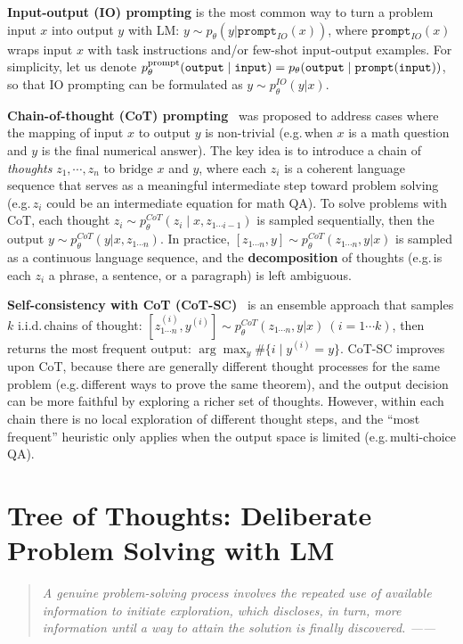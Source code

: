 \documentclass{article}
\begin{document}
\textbf{Input-output (IO) prompting} is the most common way to turn a problem input $x$ into output $y$ with LM: $y \sim p_\theta(y | \texttt{prompt}_{{IO}}(x))$, where $\texttt{prompt}_{IO}(x)$ wraps input $x$ with task instructions and/or few-shot input-output examples. For simplicity, let us denote $p_\theta^{{\rm prompt}}(\texttt{output} \mid \texttt{input}) = p_\theta(\texttt{output} \mid \texttt{prompt}(\texttt{input}))$, so that IO prompting can be formulated as $y \sim p_\theta^{IO}(y|x)$. 







\textbf{Chain-of-thought (CoT) prompting}~\citep{wei2022chain} was proposed to address cases where the mapping of input $x$ to output $y$ is  non-trivial (e.g.\,when $x$ is a math question and $y$ is the final numerical answer). The key idea is to introduce a chain of {\em thoughts} $z_1, \cdots, z_n$ to bridge $x$ and $y$, where each $z_i$ is a coherent language sequence that serves as a meaningful intermediate step toward problem solving (e.g.\,$z_i$ could be an intermediate equation for math QA). To solve problems with CoT, each thought $z_i \sim p_\theta^{CoT}(z_i \mid x, z_{1\cdots i-1})$ is sampled sequentially, then the output $y \sim p_\theta^{CoT}(y | x, z_{1 \cdots n})$. In practice, $[z_{1\cdots n}, y] \sim p_\theta^{CoT}(z_{1\cdots n}, y | x)$ is sampled as a continuous language sequence, and the \textbf{decomposition} of thoughts (e.g.\,is each $z_i$ a phrase, a sentence, or a paragraph) is left ambiguous.


\textbf{Self-consistency with CoT (CoT-SC)}~\citep{wang2022self} is an ensemble approach that samples $k$ i.i.d.\,chains of thought: $[z^{(i)}_{1\cdots n}, y^{(i)}] \sim p_\theta^{CoT}(z_{1\cdots n}, y | x) \ (i=1 \cdots k)$, then returns the most frequent output: $\arg \max_{y} \#\{i \mid y^{(i)}=y\}$. CoT-SC improves upon CoT, because there are generally different thought processes for the same problem (e.g.\,different ways to prove the same theorem), and the output decision can be more faithful by exploring a richer set of thoughts. However, within each chain there is no local exploration of different thought steps, and the ``most frequent'' heuristic only applies when the output space is limited (e.g.\,multi-choice QA).



\section{Tree of Thoughts: Deliberate Problem Solving with LM}
\begin{quote}
    \em{{A genuine problem-solving process} involves the repeated use of available information to initiate {exploration}, which discloses, in turn, more information until a way to attain the solution is finally discovered.}%
    ------ \citet{newell1959report}
    \vspace{-5pt}
\end{quote}
\end{document}
